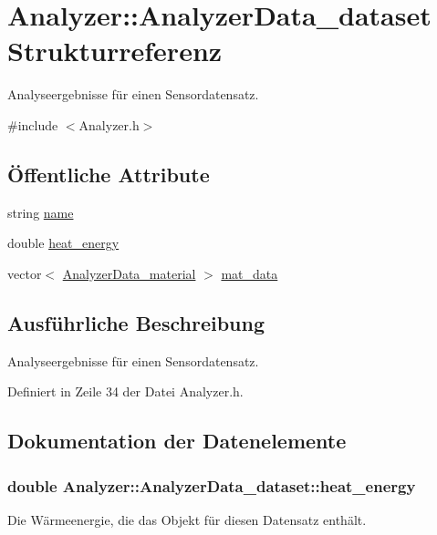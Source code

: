 \hypertarget{structAnalyzer_1_1AnalyzerData__dataset}{\section{Analyzer\-:\-:Analyzer\-Data\-\_\-dataset Strukturreferenz}
\label{structAnalyzer_1_1AnalyzerData__dataset}
}


Analyseergebnisse für einen Sensordatensatz.  




{\ttfamily \#include $<$Analyzer.\-h$>$}

\subsection*{Öffentliche Attribute}
\begin{DoxyCompactItemize}
\item 
string \hyperlink{structAnalyzer_1_1AnalyzerData__dataset_a53f3c1896123de4dc00f01e593d5f70d}{name}
\item 
double \hyperlink{structAnalyzer_1_1AnalyzerData__dataset_aaefb798e2611790d5d956fe597bbafe0}{heat\-\_\-energy}
\item 
vector$<$ \hyperlink{structAnalyzer_1_1AnalyzerData__material}{Analyzer\-Data\-\_\-material} $>$ \hyperlink{structAnalyzer_1_1AnalyzerData__dataset_a25d0189c93bc0da58f778750edb2a2b9}{mat\-\_\-data}
\end{DoxyCompactItemize}


\subsection{Ausführliche Beschreibung}
Analyseergebnisse für einen Sensordatensatz. 

Definiert in Zeile 34 der Datei Analyzer.\-h.



\subsection{Dokumentation der Datenelemente}
\hypertarget{structAnalyzer_1_1AnalyzerData__dataset_aaefb798e2611790d5d956fe597bbafe0}{
\subsubsection[{heat\-\_\-energy}]{\setlength{\rightskip}{0pt plus 5cm}double Analyzer\-::\-Analyzer\-Data\-\_\-dataset\-::heat\-\_\-energy}}\label{structAnalyzer_1_1AnalyzerData__dataset_aaefb798e2611790d5d956fe597bbafe0}
Die Wärmeenergie, die das Objekt für diesen Datensatz enthält. 

